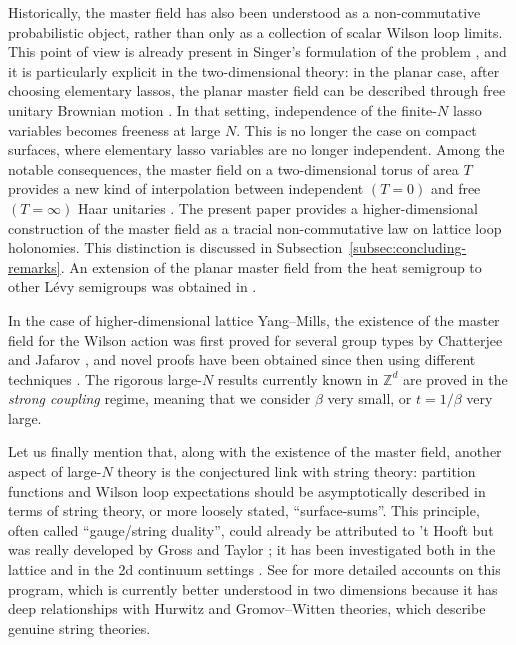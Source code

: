 \documentclass[11pt,a4paper,reqno]{amsart}
\theoremstyle{definition}
\theoremstyle{remark}
\newcommand\Z{{\mathbb{Z}}}
\begin{document}
Historically, the master field has also been understood as a non-commutative probabilistic object, rather than only as a collection of scalar Wilson loop limits.  This point of view is already present in Singer's formulation of the problem \cite{Sing95}, and it is particularly explicit in the two-dimensional theory: in the planar case, after choosing elementary lassos, the planar master field can be described through free unitary Brownian motion \cite{Lev17}. In that setting, independence of the finite-$N$ lasso variables becomes freeness at large $N$. This is no longer the case on compact surfaces, where elementary lasso variables are no longer independent. Among the notable consequences, the master field on a two-dimensional torus of area $T$ provides a new kind of interpolation between independent $(T=0)$ and free $(T=\infty)$ Haar unitaries \cite{DL25}. The present paper provides a higher-dimensional construction of the master field as a tracial non-commutative law on lattice loop holonomies.  This distinction is discussed in Subsection~\ref{subsec:concluding-remarks}. An extension of the planar master field from the heat semigroup to other L\'evy semigroups was obtained in \cite{CDG17}.

In the case of higher-dimensional lattice Yang--Mills, the existence of the master field for the Wilson action was first proved for several group types by Chatterjee and Jafarov \cite{Jaf16,Cha19}, and novel proofs have been obtained since then using different techniques \cite{SZZ23,BCSK24,BCSK25}. The rigorous large-$N$ results currently known in $\Z^d$ are proved in the \emph{strong coupling} regime, meaning that we consider $\beta$ very small, or $t=1/\beta$ very large.

Let us finally mention that, along with the existence of the master field, another aspect of large-$N$ theory is the conjectured link with string theory: partition functions and Wilson loop expectations should be asymptotically described in terms of string theory, or more loosely stated, ``surface-sums''. This principle, often called ``gauge/string duality'', could already be attributed to 't Hooft \cite{Hoo74} but was really developed by Gross and Taylor \cite{GT,GT2}; it has been investigated both in the lattice and in the 2d continuum settings \cite{Lev08,Jaf16,BaGan18,Cha19,Nov2024,LemMai25,CPS25,LM2}. See \cite{CPS25,LM2,Lem26a} for more detailed accounts on this program, which is currently better understood in two dimensions because it has deep relationships with Hurwitz and Gromov--Witten theories, which describe genuine string theories.
\end{document}
